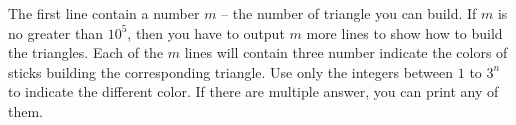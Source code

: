 The first line contain a number $m$ -- the number of triangle you can build.
If $m$ is no greater than $10^5$, then you have to output $m$ more lines to show how to build the triangles.
Each of the $m$ lines will contain three number indicate the colors of sticks building the corresponding triangle.
Use only the integers between $1$ to $3^n$ to indicate the different color. 
If there are multiple answer, you can print any of them.
